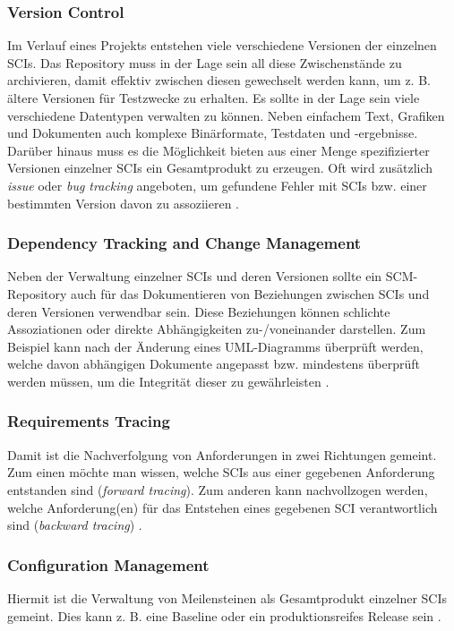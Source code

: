 \documentclass[runningheads,a4paper]{uwsese}
\begin{document}
\subsubsection{Version Control}
Im Verlauf eines Projekts entstehen viele verschiedene Versionen der einzelnen
SCIs. Das Repository muss in der Lage sein all diese Zwischenstände zu archivieren,
damit effektiv zwischen diesen gewechselt werden kann, um z. B. ältere Versionen
für Testzwecke zu erhalten.
Es sollte in der Lage sein viele verschiedene Datentypen verwalten
zu können. Neben einfachem Text, Grafiken und Dokumenten auch komplexe Binärformate,
Testdaten und -ergebnisse.
Darüber hinaus muss es die Möglichkeit bieten aus einer Menge spezifizierter
Versionen einzelner SCIs ein Gesamtprodukt zu erzeugen.
Oft wird zusätzlich {\em issue} oder {\em bug tracking} angeboten, um gefundene Fehler
mit SCIs bzw. einer bestimmten Version davon zu assoziieren
\cite[p. 592, 595]{Pressman:2009:SEP:1593949}.

\subsubsection{Dependency Tracking and Change Management}
Neben der Verwaltung einzelner SCIs und deren Versionen sollte ein SCM-Repository
auch für das Dokumentieren von Beziehungen zwischen SCIs und deren Versionen
verwendbar sein. Diese Beziehungen können schlichte Assoziationen oder direkte
Abhängigkeiten zu-/voneinander darstellen. Zum Beispiel kann nach der Änderung
eines UML-Diagramms überprüft werden, welche davon abhängigen Dokumente
angepasst bzw. mindestens überprüft werden müssen, um die Integrität dieser
zu gewährleisten
\cite[p. 592]{Pressman:2009:SEP:1593949}.

\subsubsection{Requirements Tracing}
Damit ist die Nachverfolgung von Anforderungen in zwei Richtungen gemeint.
Zum einen möchte man wissen, welche SCIs aus einer gegebenen Anforderung
entstanden sind ({\em forward tracing}). Zum anderen kann nachvollzogen werden,
welche Anforderung(en) für das Entstehen eines gegebenen SCI verantwortlich sind
({\em backward tracing})
\cite[p. 592]{Pressman:2009:SEP:1593949}.

\subsubsection{Configuration Management}
Hiermit ist die Verwaltung von Meilensteinen als Gesamtprodukt einzelner SCIs
gemeint. Dies kann z. B. eine Baseline oder ein produktionsreifes Release sein
\cite[p. 592]{Pressman:2009:SEP:1593949}.
\end{document}
